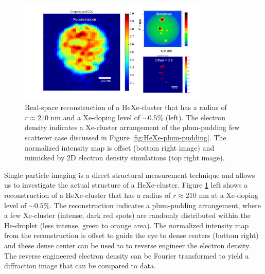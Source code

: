 \begin{figure}
 	\centering
 		\includegraphics[width=0.80\textwidth]{images/results/reconstructions-to-simulations.png}
 	\caption[Reconstruction of HeXe-clusters and simulated electron densities.]{Real-space reconstruction of a HeXe-cluster that has a radius of $r\approx 210$ nm and a Xe-doping level of $\sim 0.5\%$ (left). The electron density indicates a Xe-cluster arrangement of the plum-pudding few scatterer case discussed in Figure \ref{fig:HeXe-plum-pudding}. The normalized intensity map is offset (bottom right image) and mimicked by 2D electron density simulations (top right image).}
 	\label{fig:HeXe-cluster-60}
\end{figure}
Single particle imaging is a direct structural measurement technique and allows us to investigate the actual structure of a HeXe-cluster. Figure \ref{fig:HeXe-cluster-60} left shows a reconstruction of a HeXe-cluster that has a radius of $r\approx 210$ nm at a Xe-doping level of $\sim 0.5 \%$. The reconstruction indicates a plum-pudding arrangement, where a few Xe-cluster (intense, dark red spots) are randomly distributed within the He-droplet (less intense, green to orange area). The normalized intensity map from the reconstruction is offset to guide the eye to dense centers (bottom right) and these dense center can be used to to reverse engineer the electron density. The reverse engineered electron density can be Fourier transformed to yield a diffraction image that can be compared to data.
%
%
%
%
%
%
